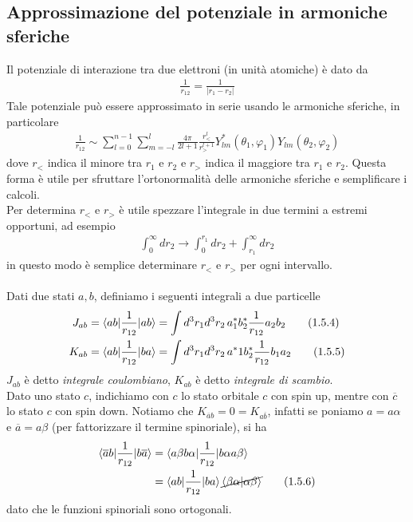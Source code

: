 \documentclass{article}
\begin{document}
\newpage
\subsection{Approssimazione del potenziale in armoniche sferiche}
Il potenziale di interazione tra due elettroni (in unità atomiche) è dato da 
\begin{align}
    \frac{1}{r_{12}} = \frac{1}{|r_1 - r_2|} \tag{1.5.1}
\end{align}
Tale potenziale può essere approssimato in serie usando le armoniche sferiche, in particolare 
\begin{align}
    \frac{1}{r_{12}} \sim \sum_{l = 0}^{n - 1}\sum_{m = -l}^l \frac{4\pi}{2l + 1}\frac{r^l_<}{r^{l + 1}_>}Y^*_{lm}(\theta_1, \varphi_1)Y_{lm}(\theta_2, \varphi_2) \tag{1.5.2}
\end{align}
dove $r_<$ indica il minore tra $r_1$ e $r_2$ e $r_>$ indica il maggiore tra $r_1$ e $r_2$. Questa forma è utile per sfruttare l'ortonormalità delle armoniche sferiche e semplificare i calcoli. \\
Per determina $r_<$ e $r_>$ è utile spezzare l'integrale in due termini a estremi opportuni, ad esempio 
\begin{align}
    \int_0^\infty dr_2 \rightarrow \int_0^{r_1} dr_2 + \int_{r_1}^\infty dr_2 \tag{1.5.3}
\end{align}
in questo modo è semplice determinare $r_<$ e $r_>$ per ogni intervallo. \\ \\
Dati due stati $a, b$, definiamo i seguenti integrali a due particelle 
\begin{align}
    J_{ab} &= \braket{ab|\frac{1}{r_{12}}|ab} = \int d^3r_1d^3r_2 \, a^*_1b^*_2\frac{1}{r_{12}}a_2b_2 \tag{1.5.4} \\
    K_{ab} &= \braket{ab|\frac{1}{r_{12}}|ba} = \int d^3r_1d^3r_2 \, a^*1b^*_2\frac{1}{r_{12}}b_1a_2 \tag{1.5.5}
\end{align}
$J_{ab}$ è detto \textit{integrale coulombiano}, $K_{ab}$ è detto \textit{integrale di scambio}. \\
Dato uno stato $c$, indichiamo con $c$ lo stato orbitale $c$ con spin up, mentre con $\overline{c}$ lo stato $c$ con spin down. Notiamo che $K_{\overline{a}b} = 0 = K_{a\overline{b}}$, infatti se poniamo $a = a\alpha$ e $\overline{a} = a\beta$ (per fattorizzare il termine spinoriale), si ha 
\begin{align}
    \braket{\overline{a}b|\frac{1}{r_{12}}|b\overline{a}} &= \braket{a\beta b\alpha|\frac{1}{r_{12}}|b\alpha a\beta} \notag \\
    &= \braket{ab|\frac{1}{r_{12}}|ba}\cancel{\braket{\beta\alpha|\alpha\beta}} \tag{1.5.6}
\end{align}
dato che le funzioni spinoriali sono ortogonali.
\end{document}
